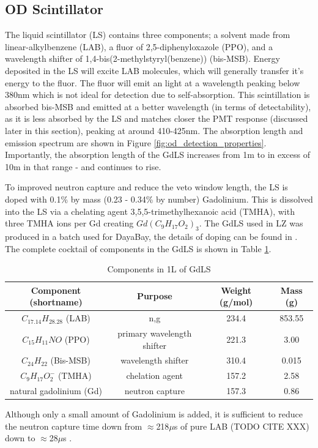 \subsection{OD Scintillator}
\par
The liquid scintillator (LS) contains three components; a solvent made from linear-alkylbenzene (LAB), a fluor of 2,5-diphenyloxazole (PPO), and a wavelength shifter of 1,4-bis(2-methylstyryl(benzene)) (bis-MSB).
Energy deposited in the LS will excite LAB molecules, which will generally transfer it's energy to the fluor. 
The fluor will emit an light at a wavelength peaking below 380nm which is not ideal for detection due to self-absorption.
This scintillation is absorbed bis-MSB and emitted at a better wavelength (in terms of detectability), as it is less absorbed by the LS and matches closer the PMT response (discussed later in this section), peaking at around 410-425nm.
The absorption length and emission spectrum are shown in Figure \ref{fig:od_detection_properties}.
Importantly, the absorption length of the GdLS increases from 1m to in excess of 10m in that range - and continues to rise.



\par
To improved neutron capture and reduce the veto window length, the LS is doped with 0.1\% by mass (0.23 - 0.34\% by number) Gadolinium.
This is dissolved into the LS via a chelating agent 3,5,5-trimethylhexanoic acid (TMHA), with three TMHA ions per Gd creating $Gd({C}_{9}{H}_{17}{O}_{2})_{3}$.
The GdLS used in LZ was produced in a batch used for DayaBay, the details of doping can be found in \cite{dayabay_gd_doping_ref}.
The complete cocktail of components in the GdLS is shown in Table \ref{tab:GdLS_Components}.

\begin{table}[!htbp]
    \centering
    \begin{tabular}{c | c | c | c}
    \hline
    {Component (shortname)} & {Purpose} & {Weight (g/mol)} & {Mass (g)} \\ \hline
    $C_{17.14}H_{28.28}$ (LAB) & n,g & 234.4  & 853.55 \\
    $C_{15}H_{11}NO$ (PPO) & primary wavelength shifter & 221.3 & 3.00 \\
    $C_{24}H_{22}$ (Bis-MSB) & wavelength shifter & 310.4 & 0.015 \\
    $C_{9}H_{17}O^{-}_{2}$ (TMHA) & chelation agent & 157.2 & 2.58 \\
    natural gadolinium (Gd) & neutron capture & 157.3 & 0.86 
    \end{tabular}
    \caption{Components in 1L of GdLS}
    \label{tab:GdLS_Components}
\end{table} 
\par
Although only a small amount of Gadolinium is added, it is sufficient to reduce the neutron capture time down from $\approx$218$\mu$s of pure LAB (TODO CITE XXX) down to $\approx$28$\mu$s \cite{ucsb_gdls_dicebox_simulations_ref}.


